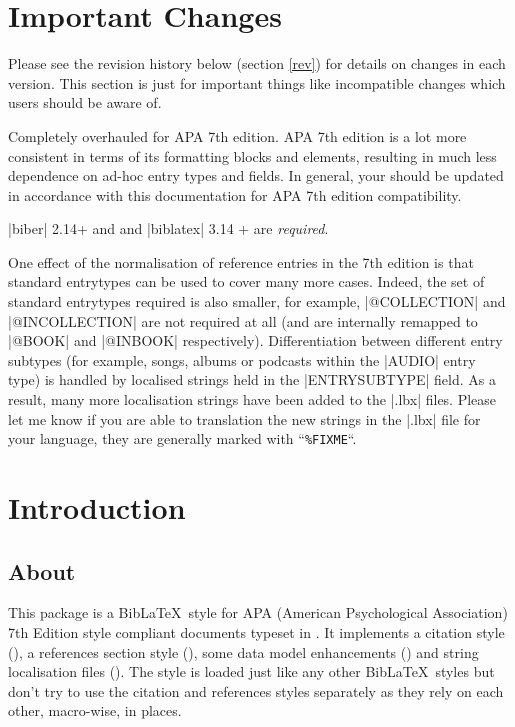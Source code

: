 \documentclass{ltxdockit}
\begin{document}
\printtitlepage
\tableofcontents

\section{Important Changes}\label{special}

Please see the revision history below (section \ref{rev}) for  details on changes in each
version. This section is just for important things like incompatible
changes which users should be aware of.

Completely overhauled for APA 7th edition. APA 7th edition is a lot more
consistent in terms of its formatting blocks and elements, resulting in
much less dependence on ad-hoc entry types and fields. In general, your
 should be updated in accordance with this documentation for APA
7th edition compatibility. 

\noindent |biber| 2.14+ and and |biblatex| 3.14 + are \emph{required}.

One effect of the normalisation of reference entries in the 7th edition is
that standard entrytypes can be used to cover many more cases. Indeed, the
set of standard entrytypes required is also smaller, for example,
|@COLLECTION| and |@INCOLLECTION| are not required at all (and are
internally remapped to |@BOOK| and |@INBOOK| respectively). Differentiation
between different entry subtypes (for example, songs, albums or podcasts
within the |AUDIO| entry type) is handled by localised strings held in the
|ENTRYSUBTYPE| field. As a result, many more localisation strings have been
added to the |.lbx| files. Please let me know if you are able to
translation the new strings in the |.lbx| file for your language, they are
generally marked with ``\texttt{\%FIXME}``.

\section{Introduction}\label{int}

\subsection{About}

This package is a Bib\LaTeX\ style for APA (American Psychological
Association) 7th Edition style compliant documents typeset in \latex. It
implements a citation style (), a references section style
(), some data model enhancements () and string
localisation files (). The style is loaded just
like any other Bib\LaTeX\ styles but don't try to use the citation and
references styles separately as they rely on each other, macro-wise, in
places.
\end{document}
